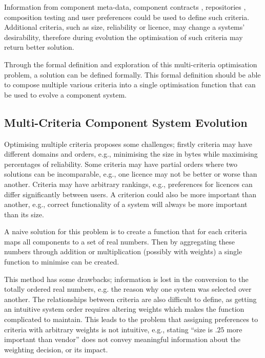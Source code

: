 Information from component meta-data, component contracts \cite{Watkins1999}, repositories \cite{Guo2000}, 
composition testing \cite{XuejieZhang2008} and user preferences could be used to define such criteria.
Additional criteria, such as size, reliability or licence, may change a systems' desirability, 
therefore during evolution the optimisation of such criteria may return better solution.

Through the formal definition and exploration of this multi-criteria optimisation problem,
a solution can be defined formally.
This formal definition should be able to compose multiple various criteria into a single optimisation function that can be used to evolve a component system.

\subsection{Multi-Criteria Component System Evolution}
Optimising multiple criteria proposes some challenges; firstly criteria may have different domains and orders, 
e.g., minimising the size in bytes while maximising percentages of reliability. 
Some criteria may have partial orders where two solutions can be incomparable,
e.g., one licence may not be better or worse than another.
Criteria may have arbitrary rankings, 
e.g., preferences for licences can differ significantly between users.
A criterion could also be more important than another, 
e.g., correct functionality of a system will always be more important than its size.

A naive solution for this problem is to create a function that for each criteria maps all components to a set of real numbers.
Then by aggregating these numbers through addition or multiplication (possibly with weights) a single function to minimise can be created. 

This method has some drawbacks;
information is lost in the conversion to the totally ordered real numbers,
e.g. the reason why one system was selected over another.
The relationships between criteria are also difficult to define, as getting an intuitive system order requires altering weights which makes the function complicated to maintain.
This leads to the problem that assigning preferences to criteria with arbitrary weights is not intuitive,
e.g., stating ``size is $.25$ more important than vendor'' does not convey meaningful information about the weighting decision, or its impact.

